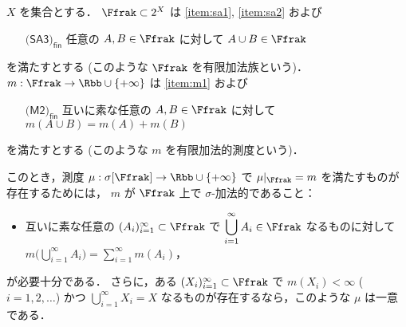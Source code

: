 \begin{theorem}\label{thm:Hopf_extension}
    \leavevmode\par
    $X$ を集合とする．
    $\Ffrak\subset2^X$ は \ref{item:sa1}, \ref{item:sa2} および
    \begin{enumerate}[align=left]
        \item[$\textsf{(SA3)}_\textsf{fin}$] 任意の $A,B\in\Ffrak$ に対して $A\cup B\in\Ffrak$
    \end{enumerate}
    を満たすとする (このような $\Ffrak$ を有限加法族という)．
    $m:\Ffrak\to\Rbb\cup\{+\infty\}$ は \ref{item:m1} および
    \begin{enumerate}[align=left]
        \item[$\textsf{(M2)}_\textsf{fin}$] 互いに素な任意の $A,B\in\Ffrak$ に対して $m(A\cup B)=m(A)+m(B)$
    \end{enumerate}
    を満たすとする (このような $m$ を有限加法的測度という)．

    このとき，測度 $\mu:\sigma[\Ffrak]\to\Rbb\cup\{+\infty\}$ で $\mu\vert_\Ffrak=m$ を満たすものが存在するためには，
    $m$ が $\Ffrak$ 上で $\sigma$-加法的であること：
    \begin{itemize}
        \item 互いに素な任意の $(A_i)_{i=1}^\infty\subset\Ffrak$ で
            $\displaystyle\bigcup_{i=1}^\infty A_i\in\Ffrak$ なるものに対して
            $\displaystyle m\biggl(\bigcup_{i=1}^\infty A_i\biggr)=\sum_{i=1}^\infty m(A_i)$，
    \end{itemize}
    が必要十分である．
    さらに，ある $(X_i)_{i=1}^\infty\subset\Ffrak$ で
    $m(X_i)<\infty$ ($i=1,2,\ldots$) かつ $\displaystyle\bigcup_{i=1}^\infty X_i=X$
    なるものが存在するなら，このような $\mu$ は一意である．
\end{theorem}

